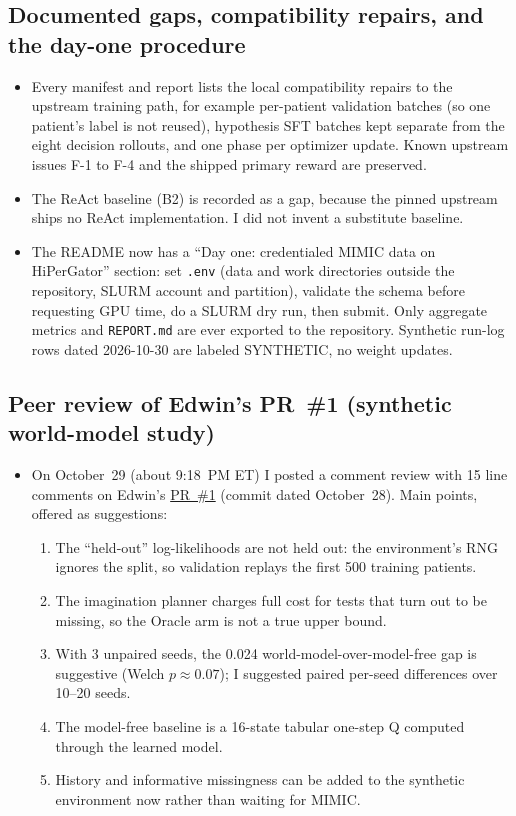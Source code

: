 \documentclass[11pt,letterpaper]{article}
\begin{document}
\subsection{Documented gaps, compatibility repairs, and the day-one procedure}
\begin{itemize}
  \item Every manifest and report lists the local compatibility repairs to the upstream training path, for example per-patient validation batches (so one patient's label is not reused), hypothesis SFT batches kept separate from the eight decision rollouts, and one phase per optimizer update. Known upstream issues F-1 to F-4 and the shipped primary reward are preserved.
  \item The ReAct baseline (B2) is recorded as a gap, because the pinned upstream ships no ReAct implementation. I did not invent a substitute baseline.
  \item The README now has a ``Day one: credentialed MIMIC data on HiPerGator'' section: set \texttt{.env} (data and work directories outside the repository, SLURM account and partition), validate the schema before requesting GPU time, do a SLURM dry run, then submit. Only aggregate metrics and \texttt{REPORT.md} are ever exported to the repository. Synthetic run-log rows dated 2026-10-30 are labeled SYNTHETIC, no weight updates.
\end{itemize}

\subsection{Peer review of Edwin's PR~\#1 (synthetic world-model study)}
\begin{itemize}
  \item On October~29 (about 9:18~PM ET) I posted a comment review with 15 line comments on Edwin's \href{https://github.com/scalinity/testing-in-imagination/pull/1}{PR~\#1} (commit dated October~28). Main points, offered as suggestions:
  \begin{enumerate}[label=(\alph*),itemsep=0.05em,topsep=0.1em]
    \item The ``held-out'' log-likelihoods are not held out: the environment's RNG ignores the split, so validation replays the first 500 training patients.
    \item The imagination planner charges full cost for tests that turn out to be missing, so the Oracle arm is not a true upper bound.
    \item With 3 unpaired seeds, the 0.024 world-model-over-model-free gap is suggestive (Welch $p \approx 0.07$); I suggested paired per-seed differences over 10--20 seeds.
    \item The model-free baseline is a 16-state tabular one-step Q computed through the learned model.
    \item History and informative missingness can be added to the synthetic environment now rather than waiting for MIMIC.
  \end{enumerate}
\end{itemize}
\end{document}
